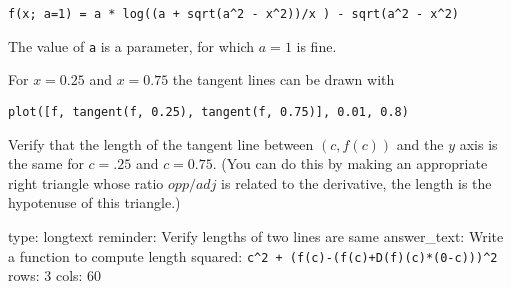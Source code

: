\documentclass[12pt]{article}
\begin{document}
\begin{verbatim}
f(x; a=1) = a * log((a + sqrt(a^2 - x^2))/x ) - sqrt(a^2 - x^2)
\end{verbatim}
The value of \texttt{a} is a parameter, for which $a=1$ is fine.

For $x=0.25$ and $x=0.75$ the tangent lines can be drawn with



\begin{verbatim}
plot([f, tangent(f, 0.25), tangent(f, 0.75)], 0.01, 0.8)
\end{verbatim}
Verify that the length of the tangent line between $(c, f(c))$ and the
$y$ axis is the same for $c=.25$ and $c=0.75$. (You can do this by
making an appropriate right triangle whose ratio $opp/adj$ is related to
the derivative, the length is the hypotenuse of this triangle.)

\begin{answer}
type: longtext
reminder: Verify lengths of two lines are same
answer_text: Write a function to compute length squared: \verb#c^2 + (f(c)-(f(c)+D(f)(c)*(0-c)))^2# 
rows: 3
cols: 60
\end{answer}
\end{document}
